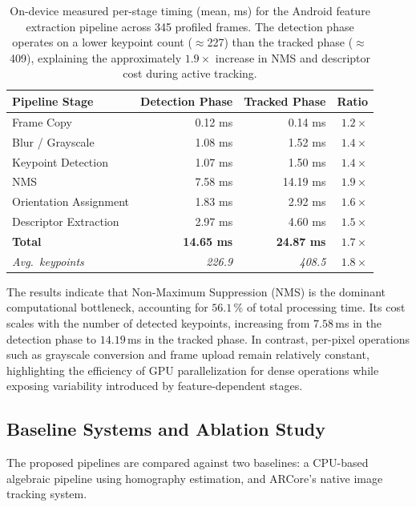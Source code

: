 \begin{table}[htbp]
\centering
\caption{On-device measured per-stage timing (mean, ms) for the Android feature extraction pipeline across 345 profiled frames. The detection phase operates on a lower keypoint count ($\approx$227) than the tracked phase ($\approx$409), explaining the approximately $1.9\times$ increase in NMS and descriptor cost during active tracking.}
\label{tab:android_profiling}
\begin{tabular}{@{}lrrr@{}}
\toprule
\textbf{Pipeline Stage} & \textbf{Detection Phase} & \textbf{Tracked Phase} & \textbf{Ratio} \\
\midrule
Frame Copy               & 0.12 ms & 0.14 ms & $1.2\times$ \\
Blur / Grayscale         & 1.08 ms & 1.52 ms & $1.4\times$ \\
Keypoint Detection       & 1.07 ms & 1.50 ms & $1.4\times$ \\
NMS                      & 7.58 ms & 14.19 ms & $1.9\times$ \\
Orientation Assignment   & 1.83 ms & 2.92 ms  & $1.6\times$ \\
Descriptor Extraction    & 2.97 ms & 4.60 ms  & $1.5\times$ \\
\midrule
\textbf{Total}           & \textbf{14.65 ms} & \textbf{24.87 ms} & \textbf{$1.7\times$} \\
\midrule
\textit{Avg.\ keypoints} & \textit{226.9} & \textit{408.5} & $1.8\times$ \\
\bottomrule
\end{tabular}
\end{table}

The results indicate that Non-Maximum Suppression (NMS) is the dominant computational bottleneck, accounting for $56.1$\,\% of total processing time. Its cost scales with the number of detected keypoints, increasing from $7.58$\,ms in the detection phase to $14.19$\,ms in the tracked phase. In contrast, per-pixel operations such as grayscale conversion and frame upload remain relatively constant, highlighting the efficiency of GPU parallelization for dense operations while exposing variability introduced by feature-dependent stages.

\subsection{Baseline Systems and Ablation Study}

The proposed pipelines are compared against two baselines: a CPU-based algebraic pipeline using homography estimation, and ARCore’s native image tracking system.

